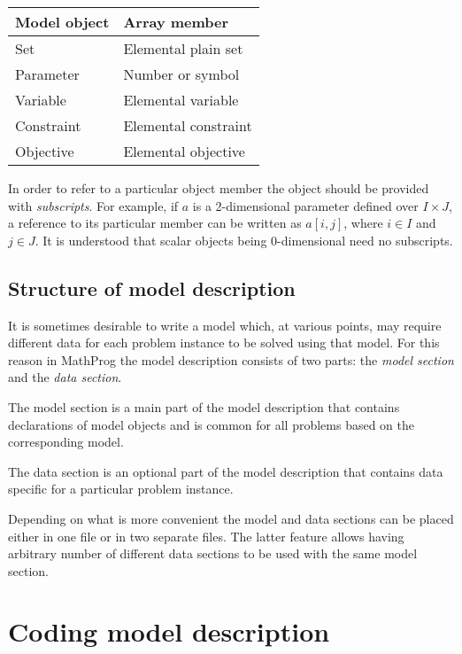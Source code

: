 \documentclass[10pt]{article}
\begin{document}
\medskip

\noindent\hfil
\begin{tabular}{@{}ll@{}}
Model object&Array member\\
\hline
Set&Elemental plain set\\
Parameter&Number or symbol\\
Variable&Elemental variable\\
Constraint&Elemental constraint\\
Objective&Elemental objective\\
\end{tabular}

\medskip

In order to refer to a particular object member the object should be
provided with {\it subscripts}. For example, if $a$ is a 2-dimensional
parameter defined over $I\times J$, a reference to its particular
member can be written as $a[i,j]$, where $i\in I$ and $j\in J$. It is
understood that scalar objects being 0-dimensional need no subscripts.

\subsection{Structure of model description}

It is sometimes desirable to write a model which, at various points,
may require different data for each problem instance to be solved using
that model. For this reason in MathProg the model description consists
of two parts: the {\it model section} and the {\it data section}.

The model section is a main part of the model description that contains
declarations of model objects and is common for all problems based on
the corresponding model.

The data section is an optional part of the model description that
contains data specific for a particular problem instance.

Depending on what is more convenient the model and data sections can be
placed either in one file or in two separate files. The latter feature
allows having arbitrary number of different data sections to be used
with the same model section.


\newpage

\section{Coding model description}
\label{coding}
\end{document}
